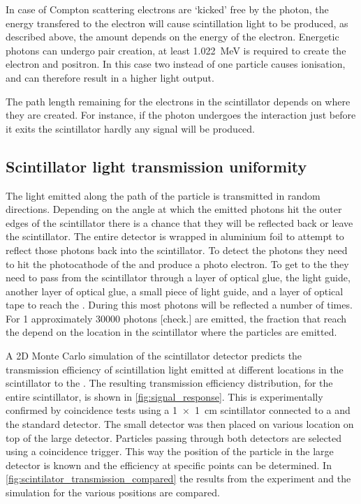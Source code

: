 In case of Compton scattering electrons are `kicked' free by the photon, the energy transfered to the electron will cause scintillation light to be produced, as described above, the amount depends on the energy of the electron. Energetic photons can undergo pair creation, at least \SI{1.022}{\MeV} is required to create the electron and positron. In this case two instead of one particle causes ionisation, and can therefore result in a higher light output.

The path length remaining for the electrons in the scintillator depends on where they are created. For instance, if the photon undergoes the interaction just before it exits the scintillator hardly any signal will be produced.


\subsection{Scintillator light transmission uniformity}

The light emitted along the path of the particle is transmitted in random directions. Depending on the angle at which the emitted photons hit the outer edges of the scintillator there is a chance that they will be reflected back or leave the scintillator. The entire detector is wrapped in aluminium foil to attempt to reflect those photons back into the scintillator. To detect the photons they need to hit the photocathode of the \pmt and produce a photo electron. To get to the \pmt they need to pass from the scintillator through a layer of optical glue, the light guide, another layer of optical glue, a small piece of light guide, and a layer of optical tape to reach the \pmt. During this most photons will be reflected a number of times. For \SI{1}{\mip} approximately 30000 photons [check.] are emitted, the fraction that reach the \pmt depend on the location in the scintillator where the particles are emitted.

A 2D Monte Carlo simulation of the scintillator detector predicts the transmission efficiency of scintillation light emitted at different locations in the scintillator to the \pmt \cite{steijger2010mc}. The resulting transmission efficiency distribution, for the entire scintillator, is shown in \cref{fig:signal_response}. This is experimentally confirmed by coincidence tests using a \SI[product-units = repeat]{1 x 1}{\centi\meter} scintillator connected to a \pmt and the standard detector. The small detector was then placed on various location on top of the large detector. Particles passing through both detectors are selected using a coincidence trigger. This way the position of the particle in the large detector is known and the efficiency at specific points can be determined. In \cref{fig:scintilator_transmission_compared} the results from the experiment and the simulation for the various positions are compared.

